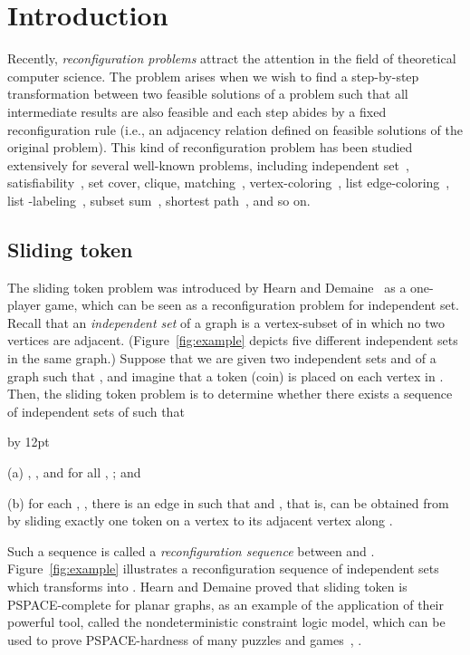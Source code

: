\documentclass{llncs}
\newenvironment{listing}[1]{\begin{list}{*}{\settowidth{\labelwidth}{#1}\setlength{\leftmargin}{\labelwidth}\advance \leftmargin by 12pt
\setlength{\itemsep}{0pt}\setlength{\parsep}{0pt}\setlength{\topsep}{0pt}\setlength{\parskip}{0pt}}}{\end{list}}
\newcounter{one}
\newcounter{two}
\newcounter{five}
\begin{document}
\section{Introduction}

Recently, {\em reconfiguration problems} attract the attention 
in the field of theoretical computer science. 
The problem arises when we wish to find a step-by-step transformation between 
two feasible solutions of a problem such that 
all intermediate results are also feasible and 
each step abides by a fixed reconfiguration rule 
(i.e., an adjacency relation defined on feasible solutions of the original problem).
This kind of reconfiguration problem has been studied extensively 
for several well-known problems, including 
{\sc independent set}~\cite{BB14,Bon14,BKW14,HearnDemaine2005,HearnDemaine2009,IDHPSUU,ItoKaminskiOnoSuzukiUeharaYamanaka2014,KaminskiMedvedevMilanic2012,MNRSS13,MNRW14,Wro14}, 
{\sc satisfiability}~\cite{Kolaitis,MTY11}, 
{\sc set cover}, {\sc clique}, {\sc matching}~\cite{IDHPSUU}, 
{\sc vertex-coloring}~\cite{BJLPP14,BC09,CHJ11,Wro14},
{\sc list edge-coloring}~\cite{IKD09,IKZ11},
{\sc list -labeling}~\cite{IKOZ_isaac},
{\sc subset sum}~\cite{ID11}, 
{\sc shortest path}~\cite{Bon13,KMP11}, and so on.

\subsection{{\sc Sliding token}}
The {\sc sliding token} problem was introduced by Hearn and Demaine~\cite{HearnDemaine2005} 
as a one-player game, which can be seen as a reconfiguration problem for {\sc independent set}. 
Recall that an {\em independent set} of a graph  is a vertex-subset of  in which 
no two vertices are adjacent. 
(Figure~\ref{fig:example} depicts five different independent sets in the same graph.)
Suppose that we are given two independent sets  and  of a graph 
 such that , 
and imagine that a token (coin) is placed on each vertex in . 
Then, the {\sc sliding token} problem is to determine 
whether there exists a sequence 
 of independent sets of  such that
\begin{listing}{aaa}
\item[(a)] , , 
 and  for all , ; and 
\item[(b)] for each , , 
 there is an edge  in  such that  
 and , 
 that is,  can be obtained from  by sliding exactly 
 one token on a vertex  to its adjacent vertex  along .
\end{listing}
Such a sequence is called a {\em reconfiguration sequence} between  and . 
Figure~\ref{fig:example} illustrates a reconfiguration sequence 
 of independent sets 
which transforms  into . 
Hearn and Demaine proved that {\sc sliding token} is PSPACE-complete for planar graphs, 
as an example of the application of their powerful tool, 
called the nondeterministic constraint logic model, 
which can be used to prove PSPACE-hardness of 
many puzzles and games~\cite{HearnDemaine2005}, \cite[Sec.~9.5]{HearnDemaine2009}. 
\end{document}
